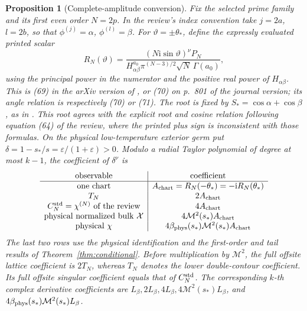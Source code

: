 \documentclass[11pt]{article}
\numberwithin{equation}{section}
\newtheorem{proposition}[theorem]{Proposition}
\theoremstyle{definition}
\newcommand{\ii}{\mathrm i}
\newcommand{\eps}{\varepsilon}
\newcommand{\M}{\mathcal M}
\begin{document}
\begin{proposition}[Complete-amplitude conversion]\label{prop:amplitudecomparison}
Fix the selected prime family and its first even order \(N=2p\).
In the review's index convention take \(j=2a\), \(l=2b\), so that
\(\phi^{(j)}=\alpha\), \(\phi^{(l)}=\beta\).
For \(\vartheta=\pm\theta_*\), define the expressly evaluated
printed scalar
\[
 R_N(\vartheta)=
 \frac{(N\ii\sin\vartheta)^\nu P_N}
 {H_{\alpha\beta}^{a_0}\pi^{(N-3)/2}\sqrt N\,\Gamma(a_0)},
\]
using the principal power in the numerator and the positive real
power of \(H_{\alpha\beta}\). This is (69) in the arXiv version
of \cite{McCoyMaillard2012}, or (70) on p.~801 of the journal
version; its angle relation is respectively (70) or (71).
The root is fixed by \(S_*=\cos\alpha+\cos\beta\), as in
\cite[(3.24)]{Orrick2001}. This root agrees with the explicit
root and cosine relation following equation (64) of the review,
where the printed plus sign is inconsistent with those formulas.
On the physical low-temperature exterior germ put
\(\delta=1-s_*/s=\eps/(1+\eps)>0\).
Modulo a radial Taylor polynomial of degree at most \(k-1\), the
coefficient of \(\delta^\nu\) is
\[
 \begin{array}{c|c}
  \text{observable}&\text{coefficient}\\ \hline
  \text{one chart}&A_{\rm chart}=R_N(-\theta_*)=-\ii R_N(\theta_*)\\
  T_N&2A_{\rm chart}\\
  C_N^{\rm std}=\chi^{(N)}\text{ of the review}&4A_{\rm chart}\\
  \text{physical normalized bulk }\mathcal X&4\M^2(s_*)A_{\rm chart}\\
  \text{physical }\chi&4\beta_{\rm phys}(s_*)\M^2(s_*)A_{\rm chart}
 \end{array}
\]
The last two rows use the physical identification and the first-order
and tail results of Theorem~\ref{thm:conditional}. Before multiplication
by \(\M^2\), the full offsite lattice coefficient is \(2T_N\), whereas
\(T_N\) denotes the lower double-contour coefficient. Its full
offsite singular coefficient equals that of \(C_N^{\rm std}\).
The corresponding \(k\)-th complex derivative coefficients are
\(L_\beta,2L_\beta,4L_\beta,4\M^2(s_*)L_\beta\), and
\(4\beta_{\rm phys}(s_*)\M^2(s_*)L_\beta\).
\end{proposition}
\end{document}
